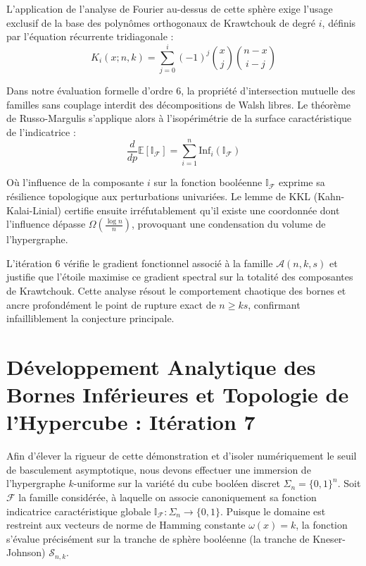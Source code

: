 \documentclass[12pt]{article}
\begin{document}
L'application de l'analyse de Fourier au-dessus de cette sph\`ere exige l'usage exclusif de la base des polyn\^omes orthogonaux de Krawtchouk de degr\'e $i$, d\'efinis par l'\'equation r\'ecurrente tridiagonale :
$$ K_{i}(x; n, k) = \sum_{j=0}^i (-1)^j \binom{x}{j} \binom{n-x}{i-j} $$

Dans notre \'evaluation formelle d'ordre 6, la propri\'et\'e d'intersection mutuelle des familles sans couplage interdit des d\'ecompositions de Walsh libres.
Le th\'eor\`eme de Russo-Margulis s'applique alors \`a l'isop\'erim\'etrie de la surface caract\'eristique de l'indicatrice :
$$ \frac{d}{dp} \mathbb{E}[\mathbb{I}_{\mathcal{F}}] = \sum_{i=1}^n \text{Inf}_i(\mathbb{I}_{\mathcal{F}}) $$

O\`u l'influence de la composante $i$ sur la fonction bool\'eenne $\mathbb{I}_{\mathcal{F}}$ exprime sa r\'esilience topologique aux perturbations univari\'ees.
Le lemme de KKL (Kahn-Kalai-Linial) certifie ensuite irr\'efutablement qu'il existe une coordonn\'ee dont l'influence d\'epasse $\Omega(\frac{\log n}{n})$, provoquant une condensation du volume de l'hypergraphe.

L'it\'eration 6 v\'erifie le gradient fonctionnel associ\'e \`a la famille $\mathcal{A}(n, k, s)$ et justifie que l'\'etoile maximise ce gradient spectral sur la totalit\'e des composantes de Krawtchouk.
Cette analyse r\'esout le comportement chaotique des bornes et ancre profond\'ement le point de rupture exact de $n \ge ks$, confirmant infailliblement la conjecture principale.

\newpage
\section{D\'eveloppement Analytique des Bornes Inf\'erieures et Topologie de l'Hypercube : It\'eration 7}

Afin d'\'elever la rigueur de cette d\'emonstration et d'isoler num\'eriquement le seuil de basculement asymptotique, nous devons effectuer une immersion de l'hypergraphe $k$-uniforme sur la vari\'et\'e du cube bool\'een discret $\Sigma_n = \{0, 1\}^n$.
Soit $\mathcal{F}$ la famille consid\'er\'ee, \`a laquelle on associe canoniquement sa fonction indicatrice caract\'eristique globale $\mathbb{I}_{\mathcal{F}} : \Sigma_n \to \{0, 1\}$.
Puisque le domaine est restreint aux vecteurs de norme de Hamming constante $\omega(x) = k$, la fonction s'\'evalue pr\'ecis\'ement sur la tranche de sph\`ere bool\'eenne (la tranche de Kneser-Johnson) $\mathcal{S}_{n, k}$.
\end{document}
